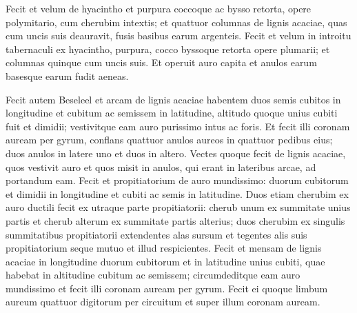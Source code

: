 \begin{biblechapter}
\begin{biblechapter}
\begin{biblechapter}
\begin{biblechapter}
\begin{biblechapter}
\begin{biblechapter}
\begin{biblechapter}
\begin{biblechapter}
\begin{biblechapter}
\begin{biblechapter}
\begin{biblechapter}
\begin{biblechapter}
\begin{biblechapter}
\begin{biblechapter}
\begin{biblechapter}
\begin{biblechapter}
\begin{biblechapter}
\begin{biblechapter}
\begin{biblechapter}
\begin{biblechapter}
\begin{biblechapter}
\begin{biblechapter}
\begin{biblechapter}
\begin{biblechapter}
\begin{biblechapter}
\begin{biblechapter}
\begin{biblechapter}
\begin{biblechapter}
\begin{biblechapter}
\begin{biblechapter}
\begin{biblechapter}
\begin{biblechapter}
\begin{biblechapter}
\begin{biblechapter}
\begin{biblechapter}
\begin{biblechapter}
 \verse Fecit et velum de hyacintho et purpura coccoque ac bysso retorta, opere polymitario, cum cherubim intextis; 
\verse et quattuor columnas de lignis acaciae, quas cum uncis suis deauravit, fusis basibus earum argenteis.
 \verse Fecit et velum in introitu tabernaculi ex hyacintho, purpura, cocco byssoque retorta opere plumarii; 
\verse et columnas quinque cum uncis suis. Et operuit auro capita et anulos earum basesque earum fudit aeneas.
 
\begin{biblechapter}
\verse Fecit autem Beseleel et arcam de lignis acaciae habentem duos semis cubitos in longitudine et cubitum ac semissem in latitudine, altitudo quoque unius cubiti fuit et dimidii; vestivitque eam auro purissimo intus ac foris. 
 \verse Et fecit illi coronam auream per gyrum, 
\verse conflans quattuor anulos aureos in quattuor pedibus eius; duos anulos in latere uno et duos in altero. 
\verse Vectes quoque fecit de lignis acaciae, quos vestivit auro 
\verse et quos misit in anulos, qui erant in lateribus arcae, ad portandum eam.
 \verse Fecit et propitiatorium de auro mundissimo: duorum cubitorum et dimidii in longitudine et cubiti ac semis in latitudine. 
\verse Duos etiam cherubim ex auro ductili fecit ex utraque parte propitiatorii: 
\verse cherub unum ex summitate unius partis et cherub alterum ex summitate partis alterius; duos cherubim ex singulis summitatibus propitiatorii 
\verse extendentes alas sursum et tegentes alis suis propitiatorium seque mutuo et illud respicientes.
 \verse Fecit et mensam de lignis acaciae in longitudine duorum cubitorum et in latitudine unius cubiti, quae habebat in altitudine cubitum ac semissem; 
\verse circumdeditque eam auro mundissimo et fecit illi coronam auream per gyrum. 
 \verse Fecit ei quoque limbum aureum quattuor digitorum per circuitum et super illum coronam auream. 

\end{biblechapter}
\end{biblechapter}
\end{biblechapter}
\end{biblechapter}
\end{biblechapter}
\end{biblechapter}
\end{biblechapter}
\end{biblechapter}
\end{biblechapter}
\end{biblechapter}
\end{biblechapter}
\end{biblechapter}
\end{biblechapter}
\end{biblechapter}
\end{biblechapter}
\end{biblechapter}
\end{biblechapter}
\end{biblechapter}
\end{biblechapter}
\end{biblechapter}
\end{biblechapter}
\end{biblechapter}
\end{biblechapter}
\end{biblechapter}
\end{biblechapter}
\end{biblechapter}
\end{biblechapter}
\end{biblechapter}
\end{biblechapter}
\end{biblechapter}
\end{biblechapter}
\end{biblechapter}
\end{biblechapter}
\end{biblechapter}
\end{biblechapter}
\end{biblechapter}
\end{biblechapter}
